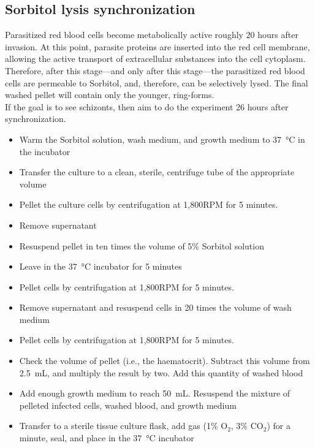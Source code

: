 \documentclass{article}
\begin{document}
\subsection{Sorbitol lysis synchronization}

Parasitized red blood cells become metabolically active roughly 20 hours after invasion. At this point, parasite proteins are inserted into the red cell membrane, allowing the active transport of extracellular substances into the cell cytoplasm. Therefore, after this stage---and only after this stage---the parasitized red blood cells are permeable to Sorbitol, and, therefore, can be selectively lysed. The final washed pellet will contain only the younger, ring-forms.\\

If the goal is to see schizonts, then aim to do the experiment 26 hours after synchronization.\\

\begin{itemize}
	\item Warm the Sorbitol solution, wash medium, and growth medium to \SI{37}{\celsius} in the incubator
	\item Transfer the culture to a clean, sterile, centrifuge tube of the appropriate volume
	\item Pellet the culture cells by centrifugation at 1,800RPM for 5 minutes.
	\item Remove supernatant
	\item Resuspend pellet in ten times the volume of 5\% Sorbitol solution
	\item Leave in the \SI{37}{\celsius} incubator for 5 minutes
	\item Pellet cells by centrifugation at 1,800RPM for 5 minutes.
	\item Remove supernatant and resuspend cells in 20 times the volume of wash medium
	\item Pellet cells by centrifugation at 1,800RPM for 5 minutes.
	\item Check the volume of pellet (i.e., the haematocrit). Subtract this volume from \SI{2.5}{mL}, and multiply the result by two. Add this quantity of washed blood
	\item Add enough growth medium to reach \SI{50}{mL}. Resuspend the mixture of pelleted infected cells, washed blood, and growth medium
	\item Transfer to a sterile tissue culture flask, add gas (1\% O$_2$, 3\% CO$_2$) for a minute, seal, and place in the \SI{37}{\celsius} incubator
\end{itemize}
\end{document}
